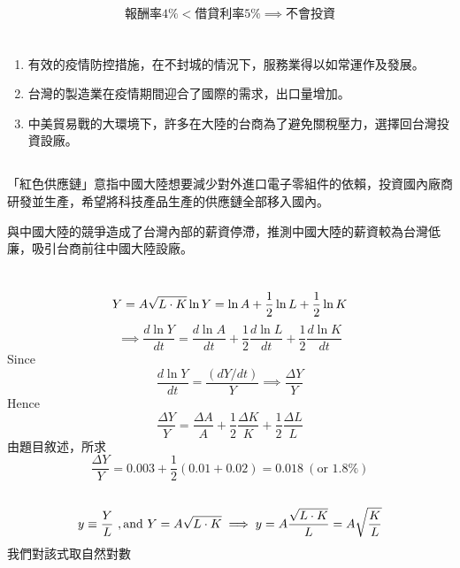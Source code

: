\documentclass[11pt]{article}
\begin{document}
\subsection{}
$$\text{報酬率} 4\%<\text{借貸利率} 5\% \implies \text{不會投資}$$


\section{}
\subsection{}
\begin{enumerate}
    \item 有效的疫情防控措施，在不封城的情況下，服務業得以如常運作及發展。
\item 台灣的製造業在疫情期間迎合了國際的需求，出口量增加。
\item  中美貿易戰的大環境下，許多在大陸的台商為了避免關稅壓力，選擇回台灣投資設廠。
\end{enumerate}
\subsection{}
「紅色供應鏈」意指中國大陸想要減少對外進口電子零組件的依賴，投資國內廠商研發並生產，希望將科技產品生產的供應鏈全部移入國內。

與中國大陸的競爭造成了台灣內部的薪資停滯，推測中國大陸的薪資較為台灣低廉，吸引台商前往中國大陸設廠。


\section{}
\subsection{}
$$
Y = A\sqrt{L\cdot K} \\
\ln Y = \ln A + \frac{1}{2} \ln L + \frac{1}{2} \ln K  
$$ 
$$
\implies \frac{d\ln Y}{dt} = \frac{d\ln A}{dt} + \frac{1}{2}\frac{d\ln L}{dt} + \frac{1}{2}\frac{d\ln K}{dt} 
$$
Since 
$$
\frac{d \ln Y}{dt} = \frac{(dY/dt)}{Y} \implies \frac{\Delta Y}{Y} 
$$
Hence 
$$
\frac{\Delta Y}{Y} = \frac{\Delta A}{A} + \frac{1}{2}\frac{\Delta K}{K} +  \frac{1}{2}\frac{\Delta L}{L}
$$
由題目敘述，所求
$$
\frac{\Delta Y}{Y} = 0.003 + \frac{1}{2}(0.01+0.02) = 0.018\ (\text{or } 1.8\%)
$$

\subsection{}
$$
y \equiv \frac{Y}{L} \ , \text{and } Y = A\sqrt{L\cdot K}
\\ \implies y = A\frac{\sqrt{L \cdot K}}{L} = A\sqrt{\frac{K}{L}}
$$
我們對該式取自然對數
\end{document}
